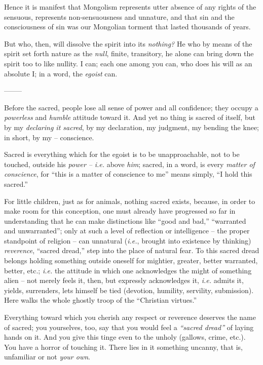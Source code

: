 Hence it is manifest that Mongolism represents utter absence of any rights of 
the sensuous, represents non-sensuousness and unnature, and that sin and the 
consciousness of sin was our Mongolian torment that lasted thousands of years.

But who, then, will dissolve the spirit into its \textit{nothing?} He who by 
means of the spirit set forth nature as the \textit{null}, finite, transitory, 
he alone can bring down the spirit too to like nullity. I can; each one among 
you can, who does his will as an absolute I; in a word, the \textit{egoist} 
can.

\begin{center}
--------\end{center}


Before the sacred, people lose all sense of power and all confidence; they 
occupy a \textit{powerless} and \textit{humble} attitude toward it. And yet no 
thing is sacred of itself, but by my \textit{declaring it sacred}, by my 
declaration, my judgment, my bending the knee; in short, by my -- conscience.

Sacred is everything which for the egoist is to be unapproachable, not to be 
touched, outside his \textit{power --} \textit{i.e.} above \textit{him}; 
sacred, in a word, is every \textit{matter of conscience}, for ``this is a 
matter of conscience to me'' means simply, ``I hold this sacred.''

For little children, just as for animals, nothing sacred exists, because, in 
order to make room for this conception, one must already have progressed so 
far in understanding that he can make distinctions like ``good and bad,'' 
``warranted and unwarranted''; only at such a level of reflection or 
intelligence -- the proper standpoint of religion -- can unnatural (\textit{i.e.}, 
brought into existence by thinking) \textit{reverence}, ``sacred 
dread,'' step into the place of natural fear. To this sacred dread belongs 
holding something outside oneself for mightier, greater, better warranted, 
better, etc.; \textit{i.e.} the attitude in which one acknowledges the might 
of something alien -- not merely feels it, then, but expressly acknowledges 
it, \textit{i.e.} admits it, yields, surrenders, lets himself be tied 
(devotion, humility, servility, submission). Here walks the whole ghostly 
troop of the ``Christian virtues.''

Everything toward which you cherish any respect or reverence deserves the name 
of sacred; you yourselves, too, say that you would feel a \textit{``sacred 
dread''} of laying hands on it. And you give this tinge even to the unholy 
(gallows, crime, etc.). You have a horror of touching it. There lies in it 
something uncanny, that is, unfamiliar or not \textit{your own}.

